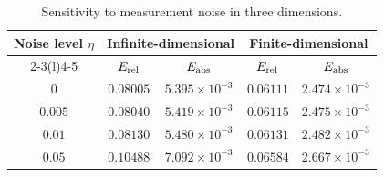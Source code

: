 \documentclass{article}
\numberwithin{equation}{section}
\theoremstyle{plain}
\begin{document}
\begin{table}[htbp]
\centering
\caption{Sensitivity to measurement noise in three dimensions.}
\label{tab:noise_3d_compact}
\begin{tabular}{@{}ccccc@{}}
\toprule
Noise level $\eta$
& \multicolumn{2}{c}{Infinite-dimensional}
& \multicolumn{2}{c}{Finite-dimensional} \\
\cmidrule(lr){2-3}\cmidrule(l){4-5}
& $E_{\rm rel}$ & $E_{\rm abs}$ & $E_{\rm rel}$ & $E_{\rm abs}$ \\
\midrule
$0$     & $0.08005$ & $5.395\!\times\!10^{-3}$ & $0.06111$ & $2.474\!\times\!10^{-3}$ \\
$0.005$ & $0.08040$ & $5.419\!\times\!10^{-3}$ & $0.06115$ & $2.475\!\times\!10^{-3}$ \\
$0.01$  & $0.08130$ & $5.480\!\times\!10^{-3}$ & $0.06131$ & $2.482\!\times\!10^{-3}$ \\
$0.05$  & $0.10488$ & $7.092\!\times\!10^{-3}$ & $0.06584$ & $2.667\!\times\!10^{-3}$ \\
\bottomrule
\end{tabular}
\end{table}
\end{document}
